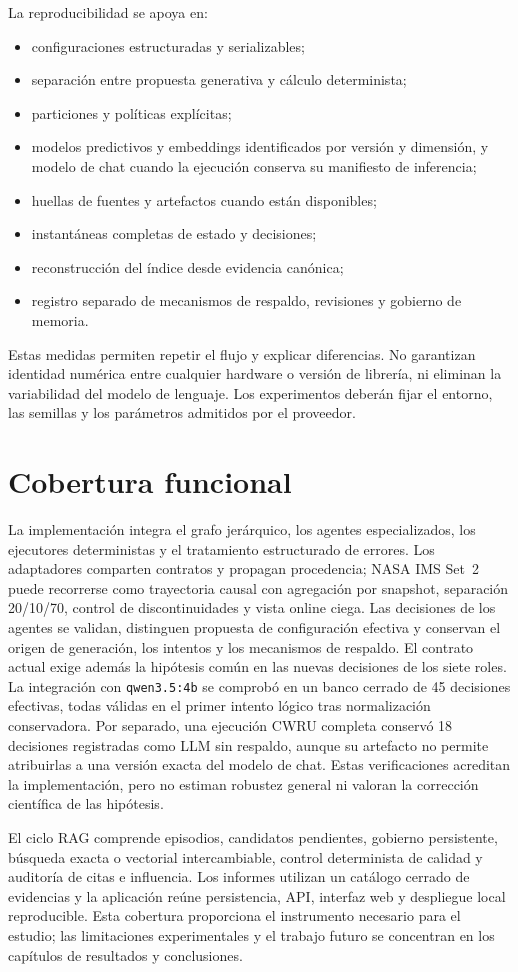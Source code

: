 La reproducibilidad se apoya en:

\begin{itemize}
  \item configuraciones estructuradas y serializables;
  \item separación entre propuesta generativa y cálculo determinista;
  \item particiones y políticas explícitas;
  \item modelos predictivos y embeddings identificados por versión y dimensión,
        y modelo de chat cuando la ejecución conserva su manifiesto de inferencia;
  \item huellas de fuentes y artefactos cuando están disponibles;
  \item instantáneas completas de estado y decisiones;
  \item reconstrucción del índice desde evidencia canónica;
  \item registro separado de mecanismos de respaldo, revisiones y gobierno de memoria.
\end{itemize}

Estas medidas permiten repetir el flujo y explicar diferencias. No garantizan
identidad numérica entre cualquier hardware o versión de librería, ni eliminan
la variabilidad del modelo de lenguaje. Los experimentos deberán fijar el
entorno, las semillas y los parámetros admitidos por el proveedor.

\section{Cobertura funcional}

La implementación integra el grafo jerárquico, los agentes especializados, los
ejecutores deterministas y el tratamiento estructurado de errores. Los
adaptadores comparten contratos y propagan procedencia; NASA IMS Set~2 puede
recorrerse como trayectoria causal con agregación por snapshot, separación
20/10/70, control de discontinuidades y vista online ciega. Las decisiones de
los agentes se validan, distinguen propuesta de configuración efectiva y
conservan el origen de generación, los intentos y los mecanismos de respaldo.
El contrato actual exige además la hipótesis común en las nuevas decisiones de
los siete roles. La integración con \texttt{qwen3.5:4b} se comprobó en un banco
cerrado de 45 decisiones efectivas, todas válidas en el primer intento lógico
tras normalización conservadora. Por separado, una ejecución CWRU completa
conservó 18 decisiones registradas como LLM sin respaldo, aunque su artefacto
no permite atribuirlas a una versión exacta del modelo de chat. Estas
verificaciones acreditan la implementación, pero no estiman robustez general
ni valoran la corrección científica de las hipótesis.

El ciclo RAG comprende episodios, candidatos pendientes, gobierno persistente,
búsqueda exacta o vectorial intercambiable, control determinista de calidad y
auditoría de citas e influencia. Los informes utilizan un catálogo cerrado de
evidencias y la aplicación reúne persistencia, API, interfaz web y despliegue
local reproducible. Esta cobertura proporciona el instrumento necesario para
el estudio; las limitaciones experimentales y el trabajo futuro se concentran
en los capítulos de resultados y conclusiones.
